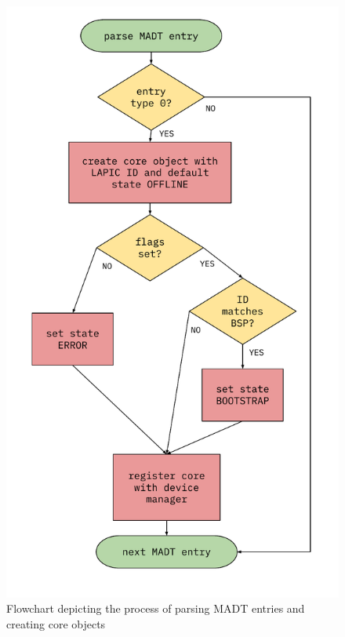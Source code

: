 \documentclass[bsc,frontabs,singlespacing,parskip,deptreport]{infthesis}
\begin{document}
\begin{figure}[h]
    \centering
    \includegraphics[scale=0.6]{figures/state-flowchart.pdf}
    \caption{Flowchart depicting the process of parsing MADT entries and creating core objects}
    \label{state-flowchart}
\end{figure}
\end{document}
